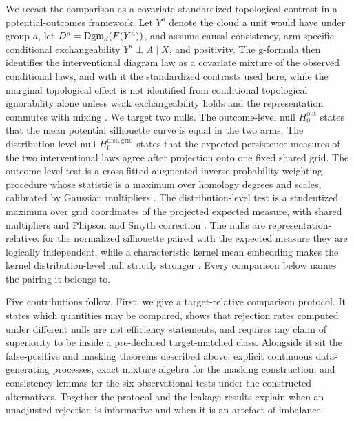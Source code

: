 We recast the comparison as a covariate-standardized topological contrast in a potential-outcomes framework. Let $Y^a$ denote the cloud a unit would have under group $a$, let $D^a = \mathrm{Dgm}_d(F(Y^a))$, and assume causal consistency, arm-specific conditional exchangeability $Y^a \perp A \mid X$, and positivity. The g-formula then identifies the interventional diagram law as a covariate mixture of the observed conditional laws, and with it the standardized contrasts used here, while the marginal topological effect is not identified from conditional topological ignorability alone unless weak exchangeability holds and the representation commutes with mixing \cite{kim_lee_tce_2026,souto_diamantis_tcda_2026,saki_faghihi_2026}. We target two nulls. The outcome-level null $H_0^{\mathrm{out}}$ states that the mean potential silhouette curve is equal in the two arms. The distribution-level null $H_0^{\mathrm{dist,grid}}$ states that the expected persistence measures of the two interventional laws agree after projection onto one fixed shared grid. The outcome-level test is a cross-fitted augmented inverse probability weighting procedure \cite{chernozhukov_dml_2018,new_robins_2018,kennedy_drlearner_2023} whose statistic is a maximum over homology degrees and scales, calibrated by Gaussian multipliers \cite{cck_2013}. The distribution-level test is a studentized maximum over grid coordinates of the projected expected measure, with shared multipliers and Phipson and Smyth correction \cite{phipson_smyth_2010}. The nulls are representation-relative: for the normalized silhouette paired with the expected measure they are logically independent, while a characteristic kernel mean embedding makes the kernel distribution-level null strictly stronger \cite{kwitt_neurips_2015}. Every comparison below names the pairing it belongs to.

Five contributions follow. First, we give a target-relative comparison protocol. It states which quantities may be compared, shows that rejection rates computed under different nulls are not efficiency statements, and requires any claim of superiority to be inside a pre-declared target-matched class. Alongside it sit the false-positive and masking theorems described above: explicit continuous data-generating processes, exact mixture algebra for the masking construction, and consistency lemmas for the six observational tests under the constructed alternatives. Together the protocol and the leakage results explain when an unadjusted rejection is informative and when it is an artefact of imbalance.

